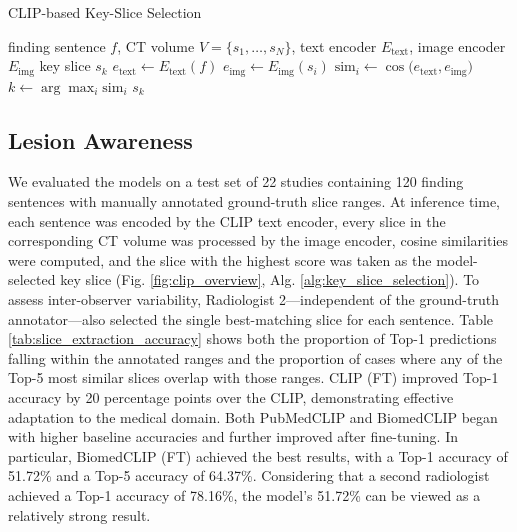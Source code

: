 \documentclass[bioengineering,article,submit,pdftex,moreauthors]{Definitions/mdpi}
\begin{document}
\begin{algorithm}
  \caption{CLIP-based Key-Slice Selection}
  \label{alg:key_slice_selection}
  \begin{algorithmic}[1]
    \REQUIRE finding sentence $f$, CT volume $V = \{s_1, \dots, s_N\}$, text encoder $E_{\mathrm{text}}$, image encoder $E_{\mathrm{img}}$
    \ENSURE key slice $s_k$
    \STATE $e_{\mathrm{text}} \leftarrow E_{\mathrm{text}}(f)$ 
      \STATE $e_{\mathrm{img}} \leftarrow E_{\mathrm{img}}(s_i)$ 
      \STATE $\mathrm{sim}_i \leftarrow \cos\bigl(e_{\mathrm{text}}, e_{\mathrm{img}}\bigr)$ 
    \ENDFOR
    \STATE $k \leftarrow \arg\max_i \mathrm{sim}_i$ 
    \RETURN $s_k$
  \end{algorithmic}
\end{algorithm}


\subsection{Lesion Awareness}\label{sec:lesion_aware}
We evaluated the models on a test set of 22 studies containing 120 finding sentences with manually annotated ground-truth slice ranges. 
At inference time, each sentence was encoded by the CLIP text encoder, every slice in the corresponding CT volume was processed by the image encoder, cosine similarities were computed, and the slice with the highest score was taken as the model-selected key slice (Fig. \ref{fig:clip_overview}, Alg. \ref{alg:key_slice_selection}). 
To assess inter-observer variability, Radiologist 2—independent of the ground-truth annotator—also selected the single best-matching slice for each sentence.
Table \ref{tab:slice_extraction_accuracy} shows both the proportion of Top-1 predictions falling within the annotated ranges and the proportion of cases where any of the Top-5 most similar slices overlap with those ranges. 
CLIP (FT) improved Top-1 accuracy by 20 percentage points over the CLIP, demonstrating effective adaptation to the medical domain.
Both PubMedCLIP and BiomedCLIP began with higher baseline accuracies and further improved after fine-tuning. 
In particular, BiomedCLIP (FT) achieved the best results, with a Top-1 accuracy of 51.72\% and a Top-5 accuracy of 64.37\%. 
Considering that a second radiologist achieved a Top-1 accuracy of 78.16\%, the model’s 51.72\% can be viewed as a relatively strong result.
\end{document}
